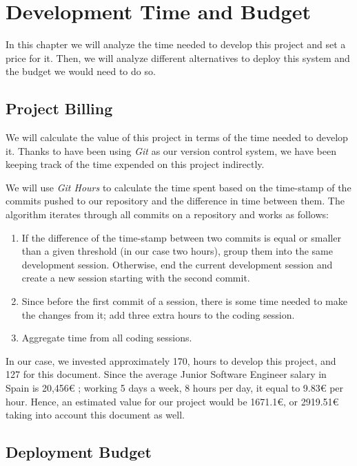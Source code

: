 \chapter{Development Time and Budget}

In this chapter we will analyze the time needed to develop this project and set a price for it. Then, we will analyze different alternatives to deploy this system and the budget we would need to do so.

\section{Project Billing}

We will calculate the value of this project in terms of the time needed to develop it. Thanks to have been using \textit{Git} as our version control system, we have been keeping track of the time expended on this project indirectly.

We will use \textit{Git Hours} \cite{git-hours} to calculate the time spent based on the time-stamp of the commits pushed to our repository and the difference in time between them. The algorithm iterates through all commits on a repository and works as follows:

\begin{enumerate}
	\item If the difference of the time-stamp between two commits is equal or smaller than a given threshold (in our case two hours), group them into the same development session. Otherwise, end the current development session and create a new session starting with the second commit.
	
	\item Since before the first commit of a session, there is some time needed to make the changes from it; add three extra hours to the coding session.
	
	\item Aggregate time from all coding sessions.
\end{enumerate}

In our case, we invested approximately 170, hours to develop this project, and 127 for this document. Since the average Junior Software Engineer salary in Spain is 20,456€ \cite{payscale}; working 5 days a week, 8 hours per day, it equal to 9.83€ per hour. Hence, an estimated value for our project would be 1671.1€, or 2919.51€ taking into account this document as well.


\section{Deployment Budget}

